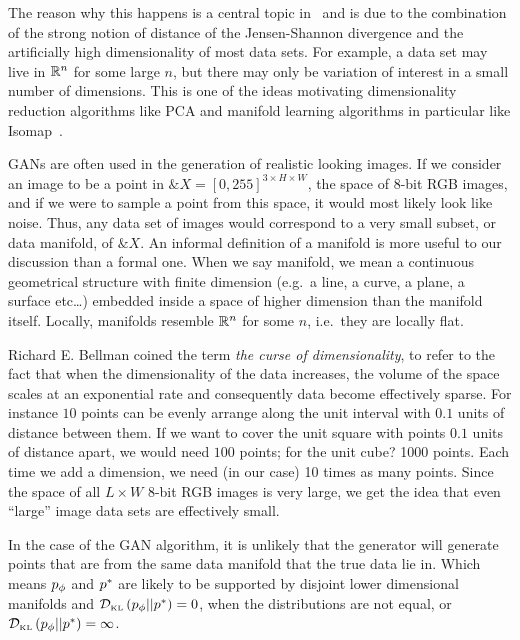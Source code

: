 
The reason why this happens is a central topic
in~\cite{ref:arjovsky-towards-2017} and is due to the combination of
the strong notion of distance of the Jensen-Shannon divergence and the
artificially high dimensionality of most data sets.  For example, a
data set may live in $\mathbb{R}^n$ for some large $n$, but there may only be
variation of interest in a small number of dimensions. This is one of
the ideas motivating dimensionality reduction algorithms like PCA and
manifold learning algorithms in particular like
Isomap~\cite{ref:tenenbaum-2000}.

GANs are often used in the generation of realistic looking images. If
we consider an image to be a point in
$\&X = {[0, 255]}^{3 \times H \times W}$, the space of 8-bit RGB
images, and if we were to sample a point from this space, it would
most likely look like noise. Thus, any data set of images would
correspond to a very small subset, or data manifold, of $\&X$. An
informal definition of a manifold is more useful to our discussion
than a formal one. When we say \textnormal{\sffamily manifold}, we
mean a continuous geometrical structure with finite dimension (e.g.\ a
line, a curve, a plane, a surface etc\dots) embedded inside a space of
higher dimension than the manifold itself.  Locally, manifolds
resemble $\mathbb{R}^n$ for some $n$, i.e.\ they are locally flat.

Richard E. Bellman coined the term \textit{the curse of
  dimensionality}, to refer to the fact that when the dimensionality
of the data increases, the volume of the space scales at an
exponential rate and consequently data become effectively sparse. For
instance $10$ points can be evenly arrange along the unit interval
with $0.1$ units of distance between them. If we want to cover the
unit square with points $0.1$ units of distance apart, we would need
$100$ points; for the unit cube? 1000 points. Each time we add a
dimension, we need (in our case) 10 times as many points. Since the
space of all $L \times W$ 8-bit RGB images is very large, we get the
idea that even ``large'' image data sets are effectively small.

In the case of the GAN algorithm, it is unlikely that the generator
will generate points that are from the same data manifold that the
true data lie in. Which means $p_{\phi}$ and $p^*$ are likely to be
supported by disjoint lower dimensional manifolds and
$\mathcal{D}_{\text{\tiny KL}}\left( p_{\phi} \middle| \middle| p^* \right) = 0$, when the distributions are not equal, or
$\mathcal{D}_{\text{\tiny KL}}\left( p_{\phi} \middle| \middle| p^* \right) = \infty$.

